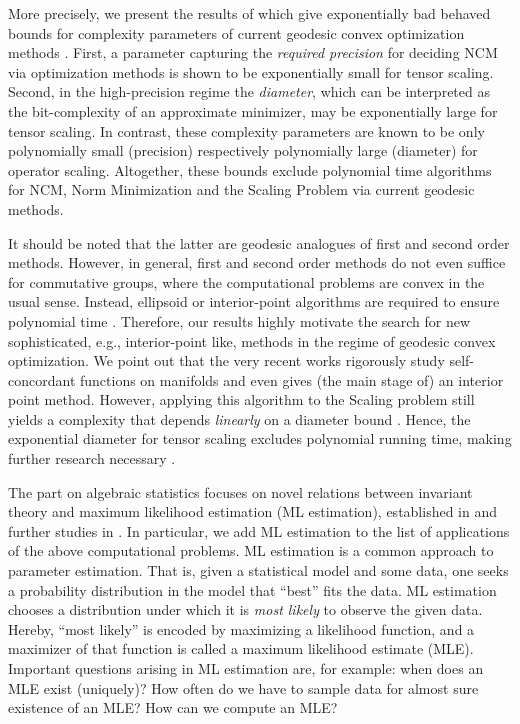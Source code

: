 More precisely, we present the results of \cite{WeightMargin} which give exponentially bad behaved bounds for complexity parameters of current geodesic convex optimization methods \cite{burgisser2020interior, allen2018operator, absil2008optimization, BoumalBook}. First, a parameter capturing the \emph{required precision} for deciding NCM via optimization methods is shown to be exponentially small for tensor scaling. Second, in the high-precision regime the \emph{diameter}, which can be interpreted as the bit-complexity of an approximate minimizer, may be exponentially large for tensor scaling.
In contrast, these complexity parameters are known to be only polynomially small (precision) respectively polynomially large (diameter) for operator scaling.
Altogether, these bounds exclude polynomial time algorithms for NCM, Norm Minimization and the Scaling Problem via current geodesic methods.

It should be noted that the latter are geodesic analogues of first and second order methods. However, in general, first and second order methods do not even suffice for commutative groups, where the computational problems are convex in the usual sense. Instead, ellipsoid or interior-point algorithms are required to ensure polynomial time \cite{singh2014entropy, straszak2019computing, burgisser2020interior}.
Therefore, our results highly motivate the search for new sophisticated, e.g., interior-point like, methods in the regime of geodesic convex optimization. We point out that the very recent works \cite{HiraiInterior, HaroldMichaelInterior} rigorously study self-concordant functions on manifolds and \cite{HaroldMichaelInterior} even gives (the main stage of) an interior point method.
However, applying this algorithm to the Scaling problem still yields a complexity that depends \emph{linearly} on a diameter bound \cite[Theorem~1.7]{HaroldMichaelInterior}. Hence, the exponential diameter for tensor scaling excludes polynomial running time, making further research necessary \cite[Outlook]{HaroldMichaelInterior}.

\bigskip

The part on algebraic statistics focuses on novel relations between invariant theory and maximum likelihood estimation (ML estimation), established in \cite{SiagaPaper} and further studies in \cite{DiscretePaper, RDAG}. In particular, we add ML estimation to the list of applications of the above computational problems.
ML estimation is a common approach to parameter estimation. That is, given a statistical model and some data, one seeks a probability distribution in the model that ``best'' fits the data. ML estimation chooses a distribution under which it is \emph{most likely} to observe the given data. Hereby, ``most likely'' is encoded by maximizing a likelihood function, and a maximizer of that function is called a maximum likelihood estimate (MLE). Important questions arising in ML estimation are, for example: when does an MLE exist (uniquely)? How often do we have to sample data for almost sure existence of an MLE? How can we compute an MLE?

